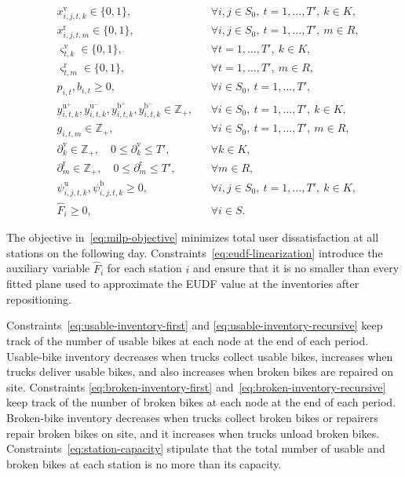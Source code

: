 \begin{subequations}\label{eq:domains}
\begin{align}
&x_{i,j,t,k}^{\mathrm{v}}
\in\{0,1\},
&&\forall i,j\in S_0,\ t=1,\ldots,T',\ k\in K, \label{eq:truck-route-domain}\\
&x_{i,j,t,m}^{\mathrm{r}}
\in\{0,1\},
&&\forall i,j\in S_0,\ t=1,\ldots,T',\ m\in R, \label{eq:repairer-route-domain}\\
&\varsigma_{t,k}^{\mathrm{v}}
\in\{0,1\},
&&\forall t=1,\ldots,T',\ k\in K, \label{eq:truck-stay-domain}\\
&\varsigma_{t,m}^{\mathrm{r}}
\in\{0,1\},
&&\forall t=1,\ldots,T',\ m\in R, \label{eq:repairer-stay-domain}\\
&p_{i,t},b_{i,t}
\ge 0,
&&\forall i\in S_0,\ t=1,\ldots,T', \label{eq:inventory-domain}\\
&y_{i,t,k}^{\mathrm{u}^{+}},y_{i,t,k}^{\mathrm{u}^{-}},
y_{i,t,k}^{\mathrm{b}^{+}},y_{i,t,k}^{\mathrm{b}^{-}}
\in\mathbb{Z}_+,
&&\forall i\in S_0,\ t=1,\ldots,T',\ k\in K, \label{eq:action-domain}\\
&g_{i,t,m}
\in\mathbb{Z}_+,
&&\forall i\in S_0,\ t=1,\ldots,T',\ m\in R, \label{eq:repair-domain}\\
&\partial_k^{\mathrm{v}}
\in\mathbb{Z}_+,\quad 0\le\partial_k^{\mathrm{v}}\le T',
&&\forall k\in K, \label{eq:truck-return-domain}\\
&\partial_m^{\mathrm{r}}
\in\mathbb{Z}_+,\quad 0\le\partial_m^{\mathrm{r}}\le T',
&&\forall m\in R, \label{eq:repairer-return-domain}\\
&\psi_{i,j,t,k}^{\mathrm{u}},\psi_{i,j,t,k}^{\mathrm{b}}
\ge 0,
&&\forall i,j\in S_0,\ t=1,\ldots,T',\ k\in K, \label{eq:load-domain}\\
&\hat F_i
\ge 0,
&&\forall i\in S. \label{eq:eudf-domain-variable}
\end{align}
\end{subequations}

The objective in~\eqref{eq:milp-objective} minimizes total user dissatisfaction
at all stations on the following day. Constraints~\eqref{eq:eudf-linearization}
introduce the auxiliary variable $\hat F_i$ for each station $i$ and ensure that
it is no smaller than every fitted plane used to approximate the EUDF value at
the inventories after repositioning.

Constraints~\eqref{eq:usable-inventory-first} and
\eqref{eq:usable-inventory-recursive} keep track of the number of usable bikes at
each node at the end of each period. Usable-bike inventory decreases when trucks
collect usable bikes, increases when trucks deliver usable bikes, and also
increases when broken bikes are repaired on site. Constraints
\eqref{eq:broken-inventory-first} and~\eqref{eq:broken-inventory-recursive} keep
track of the number of broken bikes at each node at the end of each period.
Broken-bike inventory decreases when trucks collect broken bikes or repairers
repair broken bikes on site, and it increases when trucks unload broken bikes.
Constraints~\eqref{eq:station-capacity} stipulate that the total number of
usable and broken bikes at each station is no more than its capacity.

